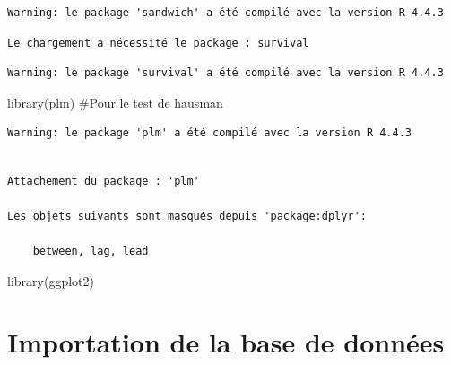 \documentclass[
  letterpaper,
  DIV=11,
  numbers=noendperiod]{scrartcl}
\newenvironment{Shaded}{\begin{snugshade}}{\end{snugshade}}
\newcommand{\CommentTok}[1]{\textcolor[rgb]{0.37,0.37,0.37}{#1}}
\newcommand{\FunctionTok}[1]{\textcolor[rgb]{0.28,0.35,0.67}{#1}}
\newcommand{\NormalTok}[1]{\textcolor[rgb]{0.00,0.23,0.31}{#1}}
\begin{document}
\begin{verbatim}
Warning: le package 'sandwich' a été compilé avec la version R 4.4.3
\end{verbatim}

\begin{verbatim}
Le chargement a nécessité le package : survival
\end{verbatim}

\begin{verbatim}
Warning: le package 'survival' a été compilé avec la version R 4.4.3
\end{verbatim}

\begin{Shaded}
\begin{Highlighting}[]
\FunctionTok{library}\NormalTok{(plm) }\CommentTok{\#Pour le test de hausman}
\end{Highlighting}
\end{Shaded}

\begin{verbatim}
Warning: le package 'plm' a été compilé avec la version R 4.4.3
\end{verbatim}

\begin{verbatim}

Attachement du package : 'plm'

Les objets suivants sont masqués depuis 'package:dplyr':

    between, lag, lead
\end{verbatim}

\begin{Shaded}
\begin{Highlighting}[]
\FunctionTok{library}\NormalTok{(ggplot2)}
\end{Highlighting}
\end{Shaded}

\section{Importation de la base de
données}\label{importation-de-la-base-de-donnuxe9es}
\end{document}
